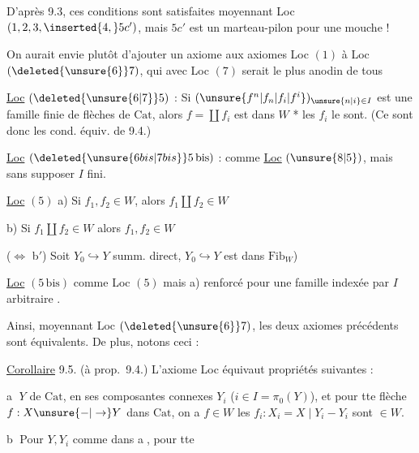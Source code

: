 
 \unsure{,}

D'après 9.3, ces conditions sont satisfaites moyennant Loc $(1,2,3,\inserted{4,}5c')$, mais $5c'$ est un marteau-pilon pour une mouche !

On aurait envie  plutôt d'ajouter  un axiome aux axiomes Loc $(1)$ à Loc $(\deleted{\unsure{6}}7)$, qui avec Loc $(7)$ serait  le plus anodin de tous


\uline{Loc} $(\deleted{\unsure{6|7}}5)$  : Si $(\unsure{f^n|f_n|f_i|f^i})_{\unsure{n|i}\in I}$ est une famille finie de flèches de $\mathrm{Cat}$, alors $f=\coprod f_i$ est dans $W$ *  les $f_i$ le sont. (Ce sont donc les cond. équiv. de 9.4.)

\uline{Loc} $(\deleted{\unsure{6 bis|7 bis}}5\,\mathrm{bis})$  : comme \uline{Loc} $(\unsure{8|5})$, mais sans supposer $I$ fini.

\uline{Loc} $(5)$ \quad a) Si $f_1,f_2\in W$, alors $f_1\amalg f_2\in W$
\par b) Si $f_1\amalg f_2\in W$ alors $f_1,f_2\in W$
\par ($\Longleftrightarrow$ b$'$) Soit $Y_0\hookrightarrow Y$ summ. direct,
 $Y_0\hookrightarrow Y$ est dans $\mathrm{Fib}_W$)

\uline{Loc} $(5\,\mathrm{bis})$ comme Loc $(5)$ mais a) renforcé  pour une famille  indexée par $I$ arbitraire .

Ainsi, moyennant Loc $(\deleted{\unsure{6}}7)$, les deux axiomes précédents sont équivalents. De plus, notons ceci :

 \uline{Corollaire} 9.5. (à prop.~9.4.) L'axiome Loc  équivaut  propriétés suivantes : 

\textcircled{a}  $Y$ de $\mathrm{Cat}$,  en ses composantes connexes $Y_i$ ($i\in I=\pi_0(Y)$),  et pour tte flèche $f:X\unsure{-|\to}Y$ dans $\mathrm{Cat}$, on a $f\in W$  les $f_i:X_i=X\mid Y_i-Y_i$ sont $\in W$.

\textcircled{b} Pour $Y,Y_i$ comme dans \textcircled{a}, pour tte
